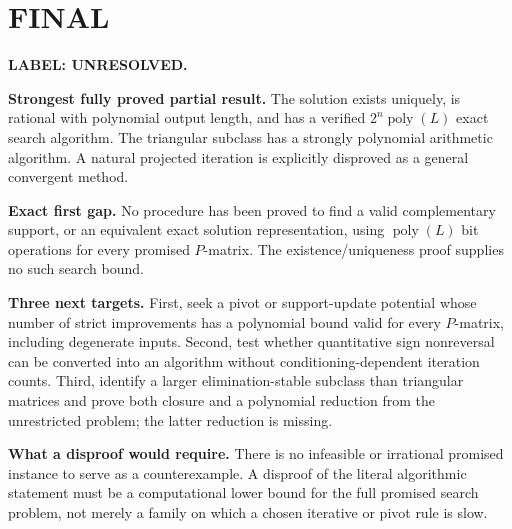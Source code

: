 \documentclass[11pt,a4paper]{article}
\theoremstyle{definition}\newtheorem{definition}[theorem]{Definition}
\theoremstyle{remark}\newtheorem{remark}[theorem]{Remark}
\newcommand{\1}{\mathbf 1}
\begin{document}
\section{FINAL}
\textbf{LABEL: UNRESOLVED.}

\textbf{Strongest fully proved partial result.} The solution exists uniquely, is rational with polynomial output length, and has a verified $2^n\operatorname{poly}(L)$ exact search algorithm. The triangular subclass has a strongly polynomial arithmetic algorithm. A natural projected iteration is explicitly disproved as a general convergent method.

\textbf{Exact first gap.} No procedure has been proved to find a valid complementary support, or an equivalent exact solution representation, using $\operatorname{poly}(L)$ bit operations for every promised $P$-matrix. The existence/uniqueness proof supplies no such search bound.

\textbf{Three next targets.} First, seek a pivot or support-update potential whose number of strict improvements has a polynomial bound valid for every $P$-matrix, including degenerate inputs. Second, test whether quantitative sign nonreversal can be converted into an algorithm without conditioning-dependent iteration counts. Third, identify a larger elimination-stable subclass than triangular matrices and prove both closure and a polynomial reduction from the unrestricted problem; the latter reduction is missing.

\textbf{What a disproof would require.} There is no infeasible or irrational promised instance to serve as a counterexample. A disproof of the literal algorithmic statement must be a computational lower bound for the full promised search problem, not merely a family on which a chosen iterative or pivot rule is slow.
\end{document}
